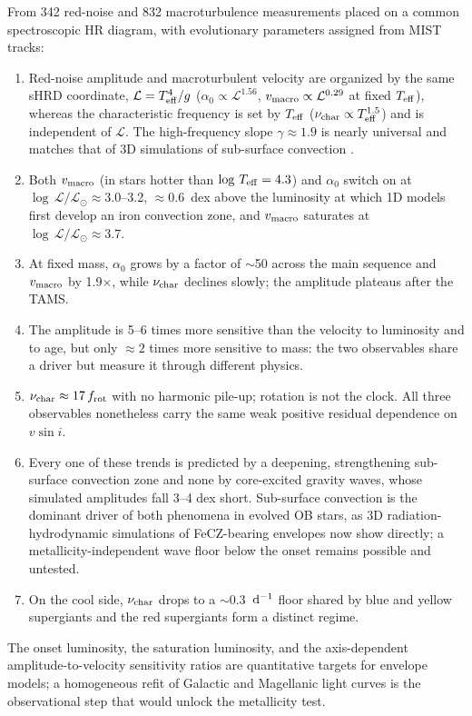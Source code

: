 \documentclass[twocolumn]{aastex631}
\newcommand{\vmac}{v_{\rm macro}}
\newcommand{\vsini}{v\sin i}
\newcommand{\teff}{T_{\rm eff}}
\newcommand{\nuchar}{\nu_{\rm char}}
\renewcommand{\ell}{\mathcal{L}}
\newcommand{\lgL}{\log\,\ell/\ell_\odot}
\newcommand{\lgT}{\log\,\teff}
\newcommand{\dinv}{{\rm d}^{-1}}
\begin{document}
From 342 red-noise and 832 macroturbulence measurements placed on a common spectroscopic HR diagram, with evolutionary parameters assigned from MIST tracks:
\begin{enumerate}
\item Red-noise amplitude and macroturbulent velocity are organized by the same sHRD coordinate, $\ell=\teff^4/g$ ($\alpha_0\propto\ell^{1.56}$, $\vmac\propto\ell^{0.29}$ at fixed $\teff$), whereas the characteristic frequency is set by $\teff$ ($\nuchar\propto\teff^{1.5}$) and is independent of $\ell$. The high-frequency slope $\gamma\approx1.9$ is nearly universal and matches that of 3D simulations of sub-surface convection \citep{schultz2022}.
\item Both $\vmac$ (in stars hotter than $\lgT=4.3$) and $\alpha_0$ switch on at $\lgL\approx3.0$--3.2, $\approx0.6$~dex above the luminosity at which 1D models first develop an iron convection zone, and $\vmac$ saturates at $\lgL\approx3.7$.
\item At fixed mass, $\alpha_0$ grows by a factor of $\sim$50 across the main sequence and $\vmac$ by 1.9$\times$, while $\nuchar$ declines slowly; the amplitude plateaus after the TAMS.
\item The amplitude is 5--6 times more sensitive than the velocity to luminosity and to age, but only $\approx2$ times more sensitive to mass: the two observables share a driver but measure it through different physics.
\item $\nuchar\approx17\,f_{\rm rot}$ with no harmonic pile-up; rotation is not the clock. All three observables nonetheless carry the same weak positive residual dependence on $\vsini$.
\item Every one of these trends is predicted by a deepening, strengthening sub-surface convection zone and none by core-excited gravity waves, whose simulated amplitudes fall 3--4 dex short. Sub-surface convection is the dominant driver of both phenomena in evolved OB stars, as 3D radiation-hydrodynamic simulations of FeCZ-bearing envelopes now show directly; a metallicity-independent wave floor below the onset remains possible and untested.
\item On the cool side, $\nuchar$ drops to a $\sim$0.3~$\dinv$ floor shared by blue and yellow supergiants and the red supergiants form a distinct regime.
\end{enumerate}
The onset luminosity, the saturation luminosity, and the axis-dependent amplitude-to-velocity sensitivity ratios are quantitative targets for envelope models; a homogeneous refit of Galactic and Magellanic light curves is the observational step that would unlock the metallicity test.
\end{document}
